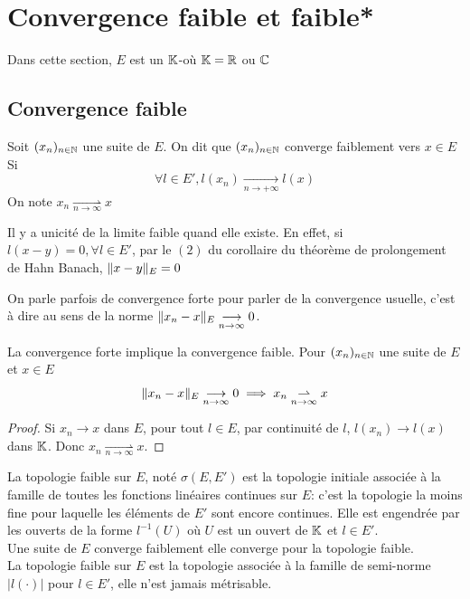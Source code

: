 \documentclass[]{report}
\begin{document}
    \section{Convergence faible et faible*}
    
    Dans cette section, $E$ est un $\mathbb{K}$-\evn où $\mathbb{K}=\mathbb{R}$ ou $\mathbb{C}$

    \subsection*{Convergence faible}

    \begin{df}{}{}
        Soit $(x_n)_{n\in\mathbb{N}}$ une suite de $E$. On dit que $(x_n)_{n\in\mathbb{N}}$ converge faiblement vers $x\in E$ Si
        \[\forall l\in E',l(x_n)\underset{n\to +\infty}{\longrightarrow}l(x)\]
        On note $x_n \underset{n\to \infty}{\rightharpoonup} x$
    \end{df}

    \begin{re}
        Il y a unicité de la limite faible quand elle existe. En effet, si $l(x-y)=0,\forall l\in E'$, par le $(2)$ du corollaire du théorème de prolongement de Hahn Banach, $\lVert x-y \rVert_E=0$
    \end{re}

    \begin{re}{}{}
        On parle parfois de convergence forte pour parler de la convergence usuelle, c'est à dire au sens de la norme $\lVert x_n-x \rVert_E\underset{n\to \infty}{\longrightarrow} 0$.
    \end{re}

    \begin{prop}{}{}
        La convergence forte implique la convergence faible. Pour $(x_n)_{n\in\mathbb{N}}$ une suite de $E$ et $x\in E$
        \[\lVert x_n-x \rVert_E \underset{n\to \infty}{\longrightarrow} 0\implies x_n \underset{n\to \infty}{\rightharpoonup} x\]
    \end{prop}

    \begin{proof}
        Si $x_n \to x$ dans $E$, pour tout $l\in E$, par continuité de $l$, $l(x_n)\to l(x)$ dans $\mathbb{K}$. Donc $x_n \underset{n\to \infty}{\rightharpoonup}x$.
    \end{proof}

    \begin{re}{}{}
        La topologie faible sur $E$, noté $\sigma(E,E')$ est la topologie initiale associée à la famille de toutes les fonctions linéaires continues sur $E$: c'est la topologie la moins fine pour laquelle les éléments de $E'$ sont encore continues. Elle est engendrée par les ouverts de la forme $l^{-1}(U)$ où $U$ est un ouvert de $\mathbb{K}$ et $l\in E'$.\\
        Une suite de $E$ converge faiblement \ssi elle converge pour la topologie faible.\\
        La topologie faible sur $E$ est la topologie associée à la famille de semi-norme $|l(\cdot)|$ pour $l\in E'$, elle n'est jamais métrisable.
    \end{re}
\end{document}
